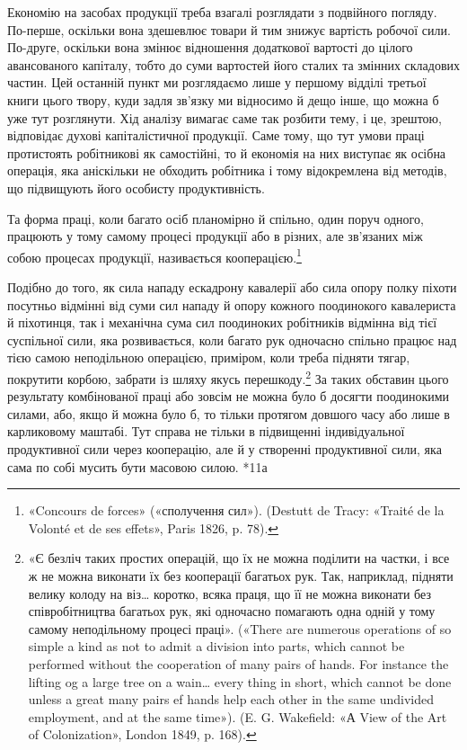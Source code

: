 Економію на засобах продукції треба взагалі розглядати з
подвійного погляду. По-перше, оскільки вона здешевлює товари
й тим знижує вартість робочої сили. По-друге, оскільки вона змінює
відношення додаткової вартості до цілого авансованого капіталу,
тобто до суми вартостей його сталих та змінних складових
частин. Цей останній пункт ми розглядаємо лише у першому
відділі третьої книги цього твору, куди задля зв’язку ми відносимо
й дещо інше, що можна б уже тут розглянути. Хід аналізу
вимагає саме так розбити тему, і це, зрештою, відповідає духові
капіталістичної продукції. Саме тому, що тут умови праці протистоять
робітникові як самостійні, то й економія на них виступає
як осібна операція, яка аніскільки не обходить робітника і
тому відокремлена від методів, що підвищують його особисту продуктивність.

Та форма праці, коли багато осіб планомірно й спільно, один
поруч одного, працюють у тому самому процесі продукції або в різних,
але зв’язаних між собою процесах продукції, називається
кооперацією.\footnote{
«Concours de forces» («сполучення сил»). (Destutt de Tracy: «Traité
de la Volonté et de ses effets», Paris 1826, p. 78).
}

Подібно до того, як сила нападу ескадрону кавалерії або сила
опору полку піхоти посутньо відмінні від суми сил нападу й
опору кожного поодинокого кавалериста й піхотинця, так і механічна
сума сил поодиноких робітників відмінна від тієї суспільної
сили, яка розвивається, коли багато рук одночасно спільно працює
над тією самою неподільною операцією, приміром, коли треба
підняти тягар, покрутити корбою, забрати із шляху якусь перешкоду.\footnote{
«Є безліч таких простих операцій, що їх не можна поділити на
частки, і все ж не можна виконати їх без кооперації багатьох рук. Так,
наприклад, підняти велику колоду на віз\dots{} коротко, всяка праця, що
її не можна виконати без співробітництва багатьох рук, які одночасно
помагають одна одній у тому самому неподільному процесі праці». («There
are numerous operations of so simple a kind as not to admit a division into
parts, which cannot be performed without the cooperation of many pairs
of hands. For instance the lifting og a large tree on a wain\dots{} every thing
in short, which cannot be done unless a great many pairs ef hands help each
other in the same undivided employment, and at the same time»). (E. G.
Wakefield: «А View of the Art of Colonization», London 1849, p. 168).
}
За таких обставин цього результату комбінованої
праці або зовсім не можна було б досягти поодинокими силами,
або, якщо й можна було б, то тільки протягом довшого часу або
лише в карликовому маштабі. Тут справа не тільки в підвищенні
індивідуальної продуктивної сили через кооперацію, але й у
створенні продуктивної сили, яка сама по собі мусить бути масовою
силою. *11а

